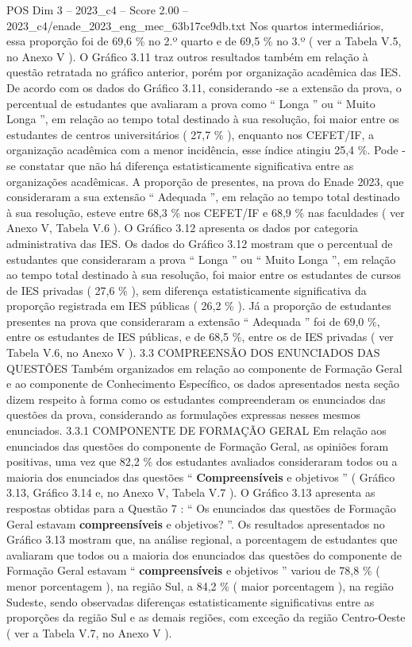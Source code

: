 \begin{textsample}{POS Dim 3 – 2023\_c4 – Score 2.00 – 2023\_c4/enade\_2023\_eng\_mec\_63b17ce9db.txt}
Nos quartos intermediários, essa proporção foi de 69,6 \% no 2.º quarto e de 69,5 \% no 3.º ( ver a Tabela V.5, no Anexo V ).
O Gráfico 3.11 traz outros resultados também em relação à questão retratada no gráfico anterior, porém por organização acadêmica das IES.
De acordo com os dados do Gráfico 3.11, considerando -se a extensão da prova, o percentual de estudantes que avaliaram a prova como “ Longa ” ou “ Muito Longa ”, em relação ao tempo total destinado à sua resolução, foi maior entre os estudantes de centros universitários ( 27,7 \% ), enquanto nos CEFET/IF, a organização acadêmica com a menor incidência, esse índice atingiu 25,4 \%.
Pode -se constatar que não há diferença estatisticamente significativa entre as organizações acadêmicas.
A proporção de presentes, na prova do Enade 2023, que consideraram a sua extensão “ Adequada ”, em relação ao tempo total destinado à sua resolução, esteve entre 68,3 \% nos CEFET/IF e 68,9 \% nas faculdades ( ver Anexo V, Tabela V.6 ).
O Gráfico 3.12 apresenta os dados por categoria administrativa das IES.
Os dados do Gráfico 3.12 mostram que o percentual de estudantes que consideraram a prova “ Longa ” ou “ Muito Longa ”, em relação ao tempo total destinado à sua resolução, foi maior entre os estudantes de cursos de IES privadas ( 27,6 \% ), sem diferença estatisticamente significativa da proporção registrada em IES públicas ( 26,2 \% ).
Já a proporção de estudantes presentes na prova que consideraram a extensão “ Adequada ” foi de 69,0 \%, entre os estudantes de IES públicas, e de 68,5 \%, entre os de IES privadas ( ver Tabela V.6, no Anexo V ). 3.3 COMPREENSÃO DOS ENUNCIADOS DAS QUESTÕES Também organizados em relação ao componente de Formação Geral e ao componente de Conhecimento Específico, os dados apresentados nesta seção dizem respeito à forma como os estudantes compreenderam os enunciados das questões da prova, considerando as formulações expressas nesses mesmos enunciados. 3.3.1 COMPONENTE DE FORMAÇÃO GERAL Em relação aos enunciados das questões do componente de Formação Geral, as opiniões foram positivas, uma vez que 82,2 \% dos estudantes avaliados consideraram todos ou a maioria dos enunciados das questões “ \textbf{Compreensíveis} e objetivos ” ( Gráfico 3.13, Gráfico 3.14 e, no Anexo V, Tabela V.7 ).
O Gráfico 3.13 apresenta as respostas obtidas para a Questão 7 : “ Os enunciados das questões de Formação Geral estavam \textbf{compreensíveis} e objetivos? ”.
Os resultados apresentados no Gráfico 3.13 mostram que, na análise regional, a porcentagem de estudantes que avaliaram que todos ou a maioria dos enunciados das questões do componente de Formação Geral estavam “ \textbf{compreensíveis} e objetivos ” variou de 78,8 \% ( menor porcentagem ), na região Sul, a 84,2 \% ( maior porcentagem ), na região Sudeste, sendo observadas diferenças estatisticamente significativas entre as proporções da região Sul e as demais regiões, com exceção da região Centro-Oeste ( ver a Tabela V.7, no Anexo V ).

\end{textsample}
